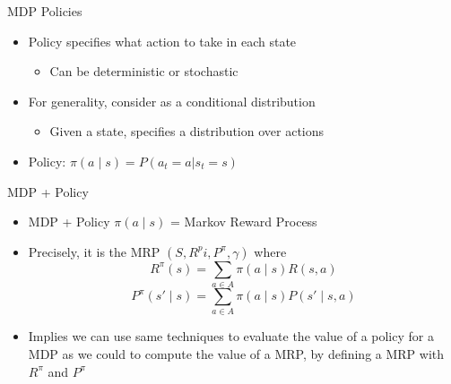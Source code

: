 \begin{frame}[c]{MDP Policies}

\begin{itemize}
	\item Policy specifies what action to take in each state
	\begin{itemize}
		\item Can be deterministic or stochastic
	\end{itemize}
	\item For generality, consider as a conditional distribution
	\begin{itemize}
		\item Given a state, specifies a distribution over actions
	\end{itemize}
	\item Policy: $\pi(a \mid s) = P(a_t=a | s_t = s)$
\end{itemize}


\end{frame}
\begin{frame}[c]{MDP + Policy}

\begin{itemize}
	\item MDP + Policy $\pi(a \mid s)$ = Markov Reward Process
	\item Precisely, it is the MRP $(S,R^pi, P^\pi, \gamma)$ where
	$$R^\pi (s) = \sum_{a\in A} \pi(a\mid s ) R(s,a) $$
   $$P^\pi (s'\mid s) = \sum_{a\in A} \pi(a \mid s) P(s' \mid s,a)$$
   \item Implies we can use same techniques to evaluate the value of a policy  for a MDP as we could to compute the value of a MRP, by defining a
   MRP with $R^\pi$ and $P^\pi$
\end{itemize}

\end{frame}
